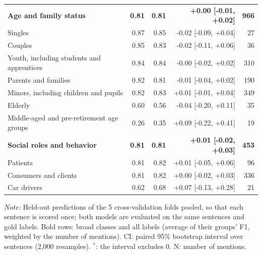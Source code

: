 \begin{table}[htbp]
\begin{threeparttable}
\begin{tabular}{l rr r r}
\addlinespace
\textbf{Age and family status} & \textbf{0.81} & \textbf{0.81} & \textbf{+0.00 [-0.01, +0.02]} & \textbf{966} \\
\quad Singles & 0.87 & 0.85 & -0.02 [-0.09, +0.04] & 27 \\
\quad Couples & 0.85 & 0.83 & -0.02 [-0.11, +0.06] & 36 \\
\quad Youth, including students and apprentices & 0.84 & 0.84 & -0.00 [-0.02, +0.02] & 310 \\
\quad Parents and families & 0.82 & 0.81 & -0.01 [-0.04, +0.02] & 190 \\
\quad Minors, including children and pupils & 0.82 & 0.83 & +0.01 [-0.01, +0.04] & 349 \\
\quad Elderly & 0.60 & 0.56 & -0.04 [-0.20, +0.11] & 35 \\
\quad Middle-aged and pre-retirement age groups & 0.26 & 0.35 & +0.09 [-0.22, +0.41] & 19 \\
\addlinespace
\textbf{Social roles and behavior} & \textbf{0.81} & \textbf{0.81} & \textbf{+0.01 [-0.02, +0.03]} & \textbf{453} \\
\quad Patients & 0.81 & 0.82 & +0.01 [-0.05, +0.06] & 96 \\
\quad Consumers and clients & 0.81 & 0.82 & +0.00 [-0.02, +0.03] & 336 \\
\quad Car drivers & 0.62 & 0.68 & +0.07 [-0.13, +0.28] & 21 \\
\bottomrule
\end{tabular}
\begin{tablenotes}[flushleft]
\footnotesize
\item \textit{Note:} Held-out predictions of the 5 cross-validation folds pooled, so that each sentence is scored once; both models are evaluated on the same sentences and gold labels. Bold rows: broad classes and all labels (average of their groups' F1, weighted by the number of mentions). CI: paired 95\% bootstrap interval over sentences (2,000 resamples). $^{*}$: the interval excludes 0. N: number of mentions.
\end{tablenotes}
\end{threeparttable}
\end{table}
